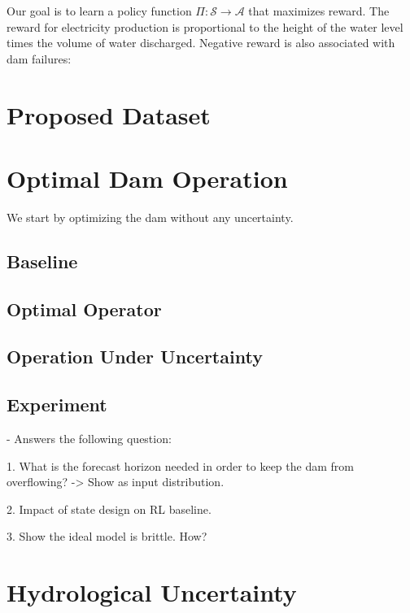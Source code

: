 \documentclass{article}
\begin{document}
Our goal is to learn a policy function $\Pi: \mathcal{S} \rightarrow \mathcal{A}$ that maximizes reward.
The reward for electricity production is proportional to the height of the water level times the volume of water discharged. Negative reward is also associated with dam failures:


\section{Proposed Dataset}
\label{sec:Proposed Dataset}


\section{Optimal Dam Operation}
\label{sec:Hydrological Uncertainty}

We start by optimizing the dam without any uncertainty.

\subsection{Baseline}
\label{sec:Dam Operation baseline}

\subsection{Optimal Operator}
\label{sec:Optimal Operator}

\subsection{Operation Under Uncertainty}
\label{sec:Operation Under Uncertainty}

\subsection{Experiment}
\label{sec:Hydrological Uncertainty}

 - Answers the following question:

1. What is the forecast horizon needed in order to keep the dam from overflowing?
-> Show as input distribution.

2. Impact of state design on RL baseline.

3. Show the ideal model is brittle. How?

\section{Hydrological Uncertainty}
\label{sec:Hydrological Uncertainty}
\end{document}
